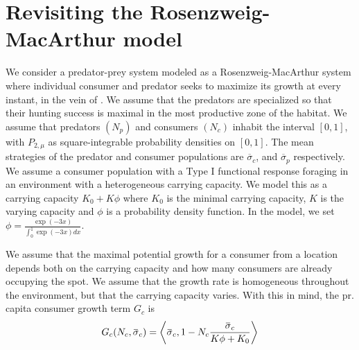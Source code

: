 \section{Revisiting the Rosenzweig-MacArthur model}
\label{sec:model_rm}
We consider a predator-prey system modeled as a Rosenzweig-MacArthur system where individual consumer and predator seeks to maximize its growth at every instant, in the vein of \citep{kvrivan2009evolutionary}. We assume that the predators are specialized so that their hunting success is maximal in the most productive zone of the habitat.
We assume that predators $(N_p)$ and consumers $(N_c)$ inhabit the interval $[0,1]$, with $P_{2,\mu}$ as square-integrable probability densities on $[0,1]$. The mean strategies of the predator and consumer populations are $\overbar{\sigma}_c$, and $\overbar{\sigma}_p$ respectively. We assume a consumer population with a Type I functional response foraging in an environment with a heterogeneous carrying capacity. We model this as a carrying capacity $K_0 + K \phi$ where $K_0$ is the minimal carrying capacity, $K$ is the varying capacity and $\phi$ is a probability density function. In the model, we set  $\phi = \frac{\exp(-3 x)}{\int_0^1 \exp(-3 x) dx}$.

We assume that the maximal potential growth for a consumer from a location depends both on the carrying capacity and how many consumers are already occupying the spot. We assume that the growth rate is homogeneous throughout the environment, but that the carrying capacity varies. With this in mind, the pr. capita consumer growth term $G_c$ is
\begin{equation}
  G_c(N_c, \overbar{\sigma}_c) = \ip{\overbar{\sigma}_c}{1-N_c \frac{\overbar{\sigma}_c}{K\phi + K_0}}
\end{equation}

